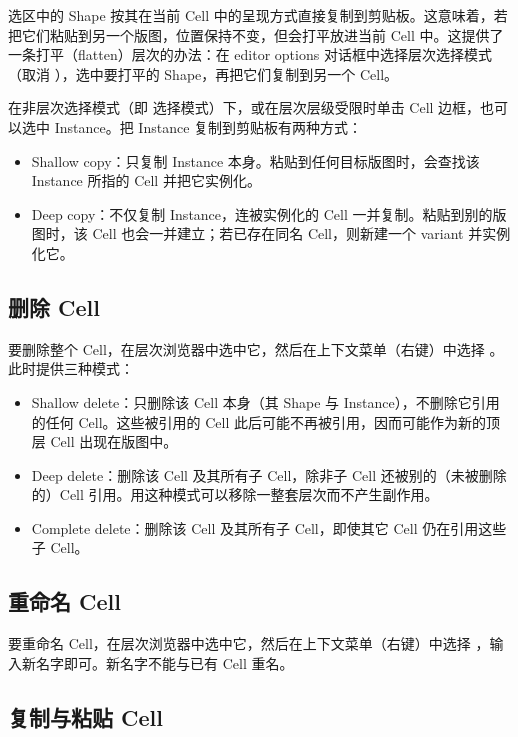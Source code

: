 选区中的 Shape 按其在当前 Cell 中的呈现方式直接复制到剪贴板。这意味着，若把它们粘贴到另一个版图，位置保持不变，但会打平放进当前 Cell 中。这提供了一条打平（flatten）层次的办法：在 editor options 对话框中选择层次选择模式（取消 ），选中要打平的 Shape，再把它们复制到另一个 Cell。

在非层次选择模式（即  选择模式）下，或在层次层级受限时单击 Cell 边框，也可以选中 Instance。把 Instance 复制到剪贴板有两种方式：

\begin{itemize}
\item Shallow copy：只复制 Instance 本身。粘贴到任何目标版图时，会查找该 Instance 所指的 Cell 并把它实例化。
\item Deep copy：不仅复制 Instance，连被实例化的 Cell 一并复制。粘贴到别的版图时，该 Cell 也会一并建立；若已存在同名 Cell，则新建一个 variant 并实例化它。
\end{itemize}

\subsection{删除 Cell}\label{sec:del_cell}

要删除整个 Cell，在层次浏览器中选中它，然后在上下文菜单（右键）中选择 。此时提供三种模式：

\begin{itemize}
\item Shallow delete：只删除该 Cell 本身（其 Shape 与 Instance），不删除它引用的任何 Cell。这些被引用的 Cell 此后可能不再被引用，因而可能作为新的顶层 Cell 出现在版图中。
\item Deep delete：删除该 Cell 及其所有子 Cell，除非子 Cell 还被别的（未被删除的）Cell 引用。用这种模式可以移除一整套层次而不产生副作用。
\item Complete delete：删除该 Cell 及其所有子 Cell，即使其它 Cell 仍在引用这些子 Cell。
\end{itemize}

\subsection{重命名 Cell}\label{sec:rename_cell}

要重命名 Cell，在层次浏览器中选中它，然后在上下文菜单（右键）中选择 ，输入新名字即可。新名字不能与已有 Cell 重名。

\subsection{复制与粘贴 Cell}\label{sec:copypaste_cell}

